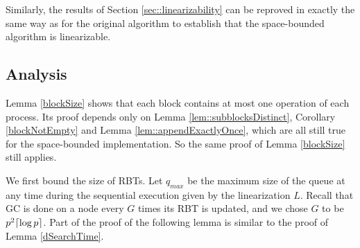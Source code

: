 Similarly, the results of Section \ref{sec::linearizability} 
can be reproved in exactly the same way as for the original algorithm to establish
that the space-bounded algorithm is linearizable.

\subsection{Analysis}
\label{sec::GCanalysis}

Lemma \ref{blockSize} shows that each block contains at most one operation of each process.
Its proof depends only on Lemma \ref{lem::subblocksDistinct}, Corollary \ref{blockNotEmpty} and Lemma \ref{lem::appendExactlyOnce}, which are all still true for the space-bounded implementation.  So the same proof of Lemma \ref{blockSize} still applies.

We first bound the size of RBTs.  Let $q_{max}$ be the maximum size of the queue at any time during the sequential execution given by the linearization $L$.
Recall that GC is done on a node every $G$ times its RBT is updated, and we chose $G$ to be $p^2\lceil \log p \rceil$.
Part of the proof of the following lemma is similar to the proof of Lemma \ref{dSearchTime}.

